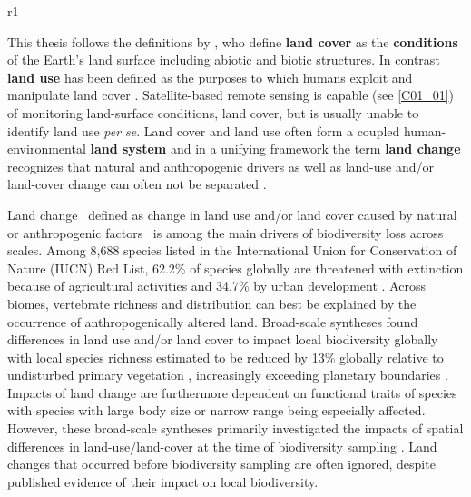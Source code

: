 \begin{wrapfigure}{r}{1\textwidth}
  \vspace{-20pt}
  \begin{center}
        \begin{definitions}[Definitions]
        This thesis follows the definitions by \cite{Lambin2006}, who define \textbf{land cover} as the \textbf{conditions} of the Earth’s land surface including abiotic and biotic structures. In contrast \textbf{land use} has been defined as the purposes to which humans exploit and manipulate land cover \citep{Lambin2006}. Satellite-based remote sensing is capable (see \ref{C01_01}) of monitoring land-surface conditions, \ie land cover, but is usually unable to identify land use \textit{per se}. Land cover and land use often form a coupled human-environmental \textbf{land system} \citep{Lambin2006,Turner2007} and in a unifying framework the term \textbf{land change} recognizes that natural and anthropogenic drivers as well as land-use and/or land-cover change can often not be separated \citep{Turner2007,Lambin2006}.
        \end{definitions}  
  \end{center}
  \vspace{-20pt}
\end{wrapfigure}

Land change \textendash\ defined as change in land use and/or land cover caused by natural or anthropogenic factors \citep[Box 1.1, ][]{Lambin2003,Turner2007,Song2018} \textendash\ is among the main drivers of biodiversity loss across scales. Among 8,688 species listed in the International Union for Conservation of Nature (IUCN) Red List, 62.2\% of species globally are threatened with extinction because of agricultural activities and 34.7\% by urban development \citep{Maxwell2016}. Across biomes, vertebrate richness \citep{Brum2013,Kehoe2017} and distribution \citep{DiMarco2015} can best be explained by the occurrence of anthropogenically altered land. Broad-scale syntheses found differences in land use and/or land cover to impact local biodiversity globally \citep{Gibson2011,Murphy2014,Newbold2014b,Newbold2015,Alroy2017} with local species richness estimated to be reduced by 13\% globally relative to undisturbed primary vegetation \citep{Newbold2015}, increasingly exceeding planetary boundaries \citep{Newbold2016}. Impacts of land change are furthermore dependent on functional traits of species \citep{Newbold2013,Jung2016} with species with large body size \citep{Newbold2013,Newbold2015} or narrow range \citep{Newbold2018} being especially affected. However, these broad-scale syntheses primarily investigated the impacts of spatial differences in land-use/land-cover at the time of biodiversity sampling \citep{Gibson2011,Murphy2014,Newbold2015,Alroy2017}. Land changes that occurred before biodiversity sampling are often ignored, despite published evidence of their impact on local biodiversity.


